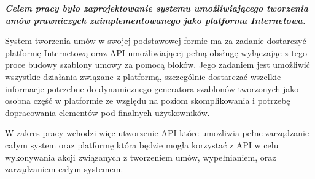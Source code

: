 \textit{\textbf{Celem pracy było zaprojektowanie systemu umożliwiającego tworzenia umów prawniczych zaimplementowanego jako platforma Internetowa.}}

\vspace{1cm}

System tworzenia umów w swojej podstawowej formie ma za zadanie dostarczyć platformę Internetową oraz API umożliwiającej pełną obsługę wyłączając z tego proce budowy szablony umowy za pomocą bloków. Jego zadaniem jest umożliwić wszystkie działania związane z platformą, szczególnie dostarczać wszelkie informacje potrzebne do dynamicznego generatora szablonów tworzonych jako osobna część w platformie ze względu na poziom skomplikowania i potrzebę dopracowania elementów pod finalnych użytkowników.

W zakres pracy wchodzi więc utworzenie API które umozliwia pełne zarządzanie całym system oraz platformę która będzie mogła korzystać z API w celu wykonywania akcji związanych z tworzeniem umów, wypełnianiem, oraz zarządzaniem całym systemem.
